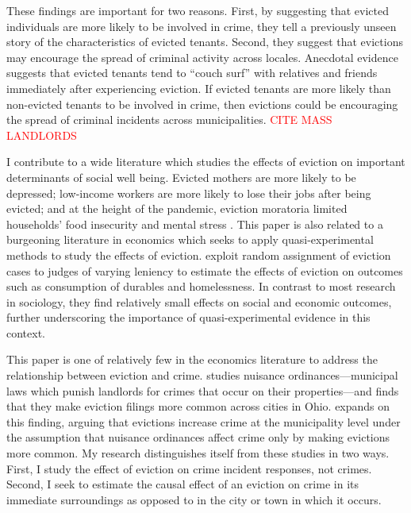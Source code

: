 \documentclass[12pt]{article}
\begin{document}
These findings are important for two reasons. First, by suggesting that evicted individuals are more likely to be involved in crime, they tell a previously unseen story of the characteristics of evicted tenants. Second, they suggest that evictions may encourage the spread of criminal activity across locales. Anecdotal evidence suggests that evicted tenants tend to ``couch surf'' with relatives and friends immediately after experiencing eviction. If evicted tenants are more likely than non-evicted tenants to be involved in crime, then evictions could be encouraging the spread of criminal incidents across municipalities. \textcolor{red}{CITE MASS LANDLORDS} 


I contribute to a wide literature which studies the effects of eviction on important determinants of social well being. Evicted mothers are more likely to be depressed; low-income workers are more likely to lose their jobs after being evicted; and at the height of the pandemic, eviction moratoria limited households’ food insecurity and mental stress \citep{desmond_housing_2016, desmond_evictions_2015, an_more_2021}. This paper is also related to a burgeoning literature in economics which seeks to apply quasi-experimental methods to study the effects of eviction. \cite{collinson_eviction_2022} exploit random assignment of eviction cases to judges of varying leniency to estimate the effects of eviction on outcomes such as consumption of durables and homelessness. In contrast to most research in sociology, they find relatively small effects on social and economic outcomes, further underscoring the importance of quasi-experimental evidence in this context.


This paper is one of relatively few in the economics literature to address the relationship between eviction and crime. \cite{kroeger_nuisance_2020} studies nuisance ordinances—municipal laws which punish landlords for crimes that occur on their properties—and finds that they make eviction filings more common across cities in Ohio. \cite{falcone_evictions_2022} expands on this finding, arguing that evictions increase crime at the municipality level under the assumption that nuisance ordinances affect crime only by making evictions more common. My research distinguishes itself from these studies in two ways. First, I study the effect of eviction on crime incident responses, not crimes. Second, I seek to estimate the causal effect of an eviction on crime in its immediate surroundings as opposed to in the city or town in which it occurs. 
\end{document}
